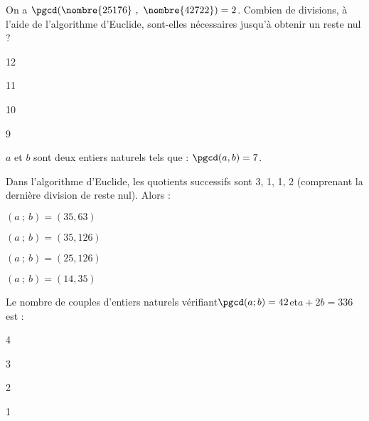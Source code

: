 \begin{QCM}
\begin{GroupeQCM}
\begin{exercice}
On a \enskip $\pgcd(\nombre{25176}~,~\nombre{42722})=2$. Combien de divisions, à l'aide de l'algorithme d'Euclide, sont-elles nécessaires jusqu'à obtenir un reste nul ?
\begin{ChoixQCM}{4}
\item 12
\item 11
\item 10
\item 9
\end{ChoixQCM}
\end{exercice}
\begin{corrige}
\end{corrige}

\begin{exercice}
$a$ et $b$ sont deux entiers naturels tels que : \enskip $\pgcd(a,b)=7$.

Dans l'algorithme d'Euclide, les quotients successifs sont 3, 1, 1, 2 (comprenant la dernière division de reste nul). Alors : 
\begin{ChoixQCM}{4}
\item $(a\ ;\ b)=(35,63)$
\item $(a\ ;\ b)=(35,126)$
\item $(a\ ;\ b)=(25,126)$
\item $(a\ ;\ b)=(14,35)$
\end{ChoixQCM}
\end{exercice}
\begin{corrige}
\end{corrige}

\begin{exercice}
Le nombre de couples d'entiers naturels vérifiant\enskip $\pgcd(a;b)=42$\enskip et\enskip $a+2b=336$\enskip est :
\begin{ChoixQCM}{4}
\item 4
\item 3
\item 2
\item 1
\end{ChoixQCM}
\end{exercice}
\begin{corrige}
\end{corrige}
\end{GroupeQCM}
\end{QCM}

